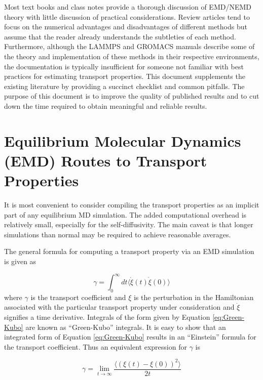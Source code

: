 \documentclass[9pt]{livecoms}
\begin{document}
Most text books and class notes provide a thorough discussion of EMD/NEMD theory with little discussion of practical considerations. Review articles tend to focus on the numerical advantages and disadvantages of different methods but assume that the reader already understands the subtleties of each method. Furthermore, although the LAMMPS and GROMACS manuals describe some of the theory and implementation of these methods in their respective environments, the documentation is typically insufficient for someone not familiar with best practices for estimating transport properties. This document supplements the existing literature by providing a succinct checklist and common pitfalls. The purpose of this document is to improve the quality of published results and to cut down the time required to obtain meaningful and reliable results. %

\section{Equilibrium Molecular Dynamics (EMD) Routes to Transport Properties}

It is most convenient to consider compiling the transport properties as an implicit part of any equilibrium MD simulation. The added computational overhead is relatively small, especially for the self-diffusivity. The main caveat is that longer simulations than normal may be required to achieve reasonable averages. 

The general formula for computing a transport property via an EMD simulation is given as

\begin{equation} \label{eq:Green-Kubo}
\gamma = \int_{0}^{\infty}dt\langle\dot{\xi}(t)\dot{\xi}(0)\rangle
\end{equation}
where $\gamma$ is the transport coefficient and $\xi$ is the perturbation in the Hamiltonian associated with the particular transport property under consideration and $\dot{\xi}$ signifies a time derivative. Integrals of the form given by Equation \ref{eq:Green-Kubo} are known as “Green-Kubo” integrals. It is easy to show that an integrated form of Equation \ref{eq:Green-Kubo} results in an “Einstein” formula for the transport coefficient. Thus an equivalent expression for $\gamma$ is

\begin{equation} \label{eq:Einstein}
\gamma = \lim_{t\to\infty} \frac{\langle (\xi(t)-\xi(0))^2 \rangle}{2t}
\end{equation}
\end{document}
